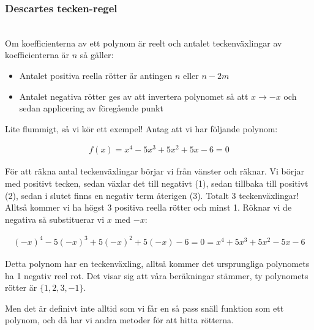 \subsubsection{Descartes tecken-regel}\hfill\\
\noindent Om koefficienterna av ett polynom är reelt och antalet teckenväxlingar av koefficienterna är $n$ så gäller:
\begin{itemize}
  \item Antalet positiva reella rötter är antingen $n$ eller $n-2m$
  \item Antalet negativa rötter ges av att invertera polynomet så att $x\to-x$ och sedan applicering av föregående punkt
\end{itemize}
\par\bigskip
\noindent Lite flummigt, så vi kör ett exempel! Antag att vi har följande polynom:

\begin{equation*}
  \begin{gathered}
    f(x) = x^4-5x^3+5x^2+5x-6=0
  \end{gathered}
\end{equation*}
\par\bigskip
\noindent För att räkna antal teckenväxlingar börjar vi från vänster och räknar. Vi börjar med positivt tecken, sedan växlar det till negativt (1), sedan tillbaka till positivt (2), sedan i slutet finns en negativ term återigen (3). Totalt 3 teckenväxlingar! Alltså kommer vi ha högst 3 positiva reella rötter och minst 1. Röknar vi de negativa så substituerar vi $x$ med $-x$:

\begin{equation*}
  \begin{gathered}
    (-x)^4-5(-x)^3+5(-x)^2+5(-x)-6 =0 = x^4+5x^3+5x^2-5x-6
  \end{gathered}
\end{equation*}
\par\bigskip
\noindent Detta polynom har en teckenväxling, alltså kommer det ursprungliga polynomets ha 1 negativ reel rot. Det visar sig att våra beräkningar stämmer, ty polynomets rötter är $\{1, 2, 3, -1\}$.
\par\bigskip
\noindent Men det är definivt inte alltid som vi får en så pass snäll funktion som ett polynom, och då har vi andra metoder för att hitta rötterna. 
